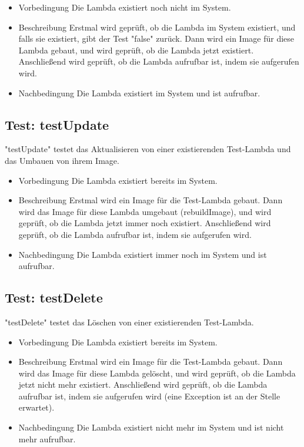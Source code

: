 \documentclass[a4paper,20pt,oneside]{book}
\begin{document}
\begin{itemize}
\item Vorbedingung\linebreak
Die Lambda existiert noch nicht im System.
\item Beschreibung\linebreak
Erstmal wird geprüft, ob die Lambda im System existiert, und falls sie existiert, gibt der Test "false" zurück. Dann wird ein Image für diese Lambda gebaut, und wird geprüft, ob die Lambda jetzt existiert. Anschließend wird geprüft, ob die Lambda aufrufbar ist, indem sie aufgerufen wird.
\item Nachbedingung\linebreak
Die Lambda existiert im System und ist aufrufbar.
\end{itemize}

\subsection{Test: testUpdate}			
	"testUpdate" testet das Aktualisieren von einer existierenden Test-Lambda und das Umbauen von ihrem Image.

\begin{itemize}
\item Vorbedingung\linebreak
Die Lambda existiert bereits im System.
\item Beschreibung\linebreak
Erstmal wird ein Image für die Test-Lambda gebaut. Dann wird das Image für diese Lambda umgebaut (rebuildImage), und wird geprüft, ob die Lambda jetzt immer noch existiert. Anschließend wird geprüft, ob die Lambda aufrufbar ist, indem sie aufgerufen wird.
\item Nachbedingung\linebreak
Die Lambda existiert immer noch im System und ist aufrufbar.
\end{itemize}

\subsection{Test: testDelete}			
	"testDelete" testet das Löschen von einer existierenden Test-Lambda.

\begin{itemize}
\item Vorbedingung\linebreak
Die Lambda existiert bereits im System.
\item Beschreibung\linebreak
Erstmal wird ein Image für die Test-Lambda gebaut. Dann wird das Image für diese Lambda gelöscht, und wird geprüft, ob die Lambda jetzt nicht mehr existiert. Anschließend wird geprüft, ob die Lambda aufrufbar ist, indem sie aufgerufen wird (eine Exception ist an der Stelle erwartet).
\item Nachbedingung\linebreak
Die Lambda existiert nicht mehr im System und ist nicht mehr aufrufbar.
\end{itemize}
\end{document}
